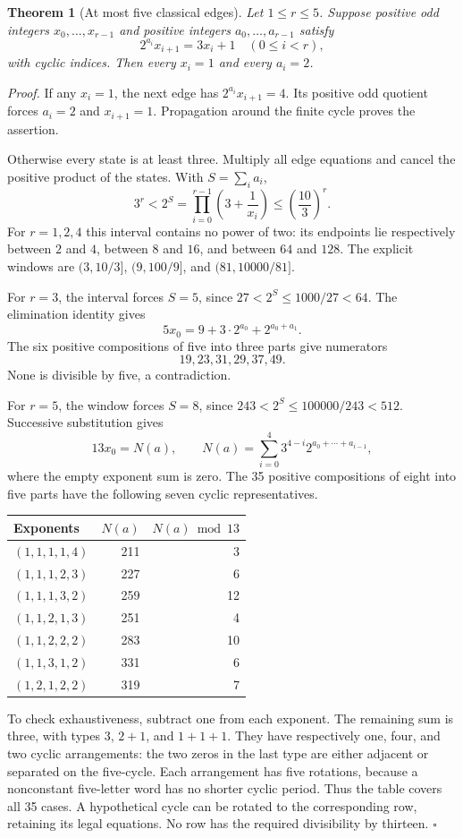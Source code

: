 \documentclass[11pt,letterpaper]{article}
\newtheorem{theorem}{Theorem}
\newenvironment{proof}{\noindent\textit{Proof.}}{\hfill\(\square\)}
\begin{document}
\begin{theorem}[At most five classical edges]
Let \(1\le r\le5\). Suppose positive odd integers \(x_0,\ldots,x_{r-1}\)
and positive integers \(a_0,\ldots,a_{r-1}\) satisfy
\[
2^{a_i}x_{i+1}=3x_i+1
\quad(0\le i<r),
\]
with cyclic indices. Then every \(x_i=1\) and every \(a_i=2\).
\end{theorem}
\begin{proof}
If any \(x_i=1\), the next edge has \(2^{a_i}x_{i+1}=4\).
Its positive odd quotient forces \(a_i=2\) and \(x_{i+1}=1\).
Propagation around the finite cycle proves the assertion.

Otherwise every state is at least three. Multiply all edge equations
and cancel the positive product of the states. With \(S=\sum_i a_i\),
\[
3^r<2^S=\prod_{i=0}^{r-1}\left(3+\frac1{x_i}\right)
\le\left(\frac{10}{3}\right)^r.
\]
For \(r=1,2,4\) this interval contains no power of two: its endpoints
lie respectively between \(2\) and \(4\), between \(8\) and \(16\),
and between \(64\) and \(128\). The explicit windows are
\((3,10/3]\), \((9,100/9]\), and \((81,10000/81]\).

For \(r=3\), the interval forces \(S=5\), since
\(27<2^S\le1000/27<64\). The elimination identity gives
\[
5x_0=9+3\cdot2^{a_0}+2^{a_0+a_1}.
\]
The six positive compositions of five into three parts give numerators
\[
19,23,31,29,37,49.
\]
None is divisible by five, a contradiction.

For \(r=5\), the window forces \(S=8\), since
\(243<2^S\le100000/243<512\). Successive substitution gives
\[
13x_0=N(a),\qquad
N(a)=\sum_{i=0}^4 3^{4-i}2^{a_0+\cdots+a_{i-1}},
\]
where the empty exponent sum is zero. The 35 positive compositions of
eight into five parts have the following seven cyclic representatives.
\begin{center}
\begin{tabular}{lrr}
\toprule
Exponents & \(N(a)\) & \(N(a)\bmod13\) \\
\midrule
\((1,1,1,1,4)\) & 211 & 3 \\
\((1,1,1,2,3)\) & 227 & 6 \\
\((1,1,1,3,2)\) & 259 & 12 \\
\((1,1,2,1,3)\) & 251 & 4 \\
\((1,1,2,2,2)\) & 283 & 10 \\
\((1,1,3,1,2)\) & 331 & 6 \\
\((1,2,1,2,2)\) & 319 & 7 \\
\bottomrule
\end{tabular}
\end{center}
To check exhaustiveness, subtract one from each exponent. The remaining
sum is three, with types \(3\), \(2+1\), and \(1+1+1\).
They have respectively one, four, and two cyclic arrangements: the two
zeros in the last type are either adjacent or separated on the five-cycle.
Each arrangement has five rotations, because a nonconstant five-letter
word has no shorter cyclic period. Thus the table covers all 35 cases.
A hypothetical cycle can be rotated to the corresponding row, retaining
its legal equations. No row has the required divisibility by thirteen.
\end{proof}
\end{document}
